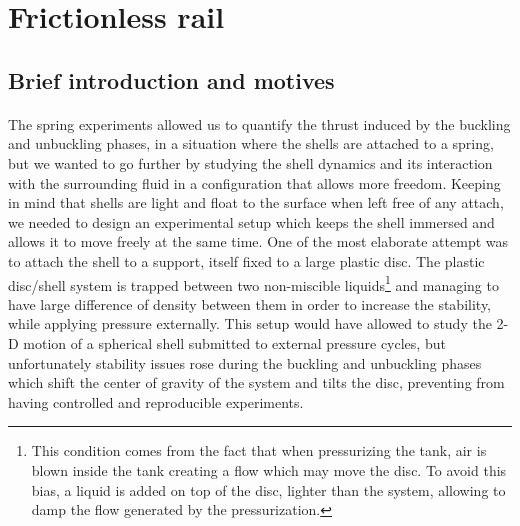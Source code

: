\section{Frictionless rail}
\subsection{Brief introduction and motives}
\paragraph{}
The spring experiments allowed us to quantify the thrust induced by the buckling and unbuckling phases, in a situation where the shells are attached to a spring, but we wanted to go further by studying the shell dynamics and its interaction with the surrounding fluid in a configuration that allows more freedom. Keeping in mind that shells are light and float to the surface when left free of any attach, we needed to design an experimental setup which keeps the shell immersed and allows it to move freely at the same time.  One of the most elaborate attempt was to attach the shell to a support, itself fixed to a large plastic disc. The plastic disc/shell system is trapped between two non-miscible liquids\footnote{This condition comes from the fact that when pressurizing the tank, air is blown inside the tank creating a flow which may move the disc. To avoid this bias, a liquid is added on top of the disc, lighter than the system, allowing to damp the flow generated by the pressurization.} and managing to have large difference of density between them in order to increase the stability, while applying pressure externally. This setup would have allowed to study the 2-D motion of a spherical shell submitted to external pressure cycles, but unfortunately stability issues rose during the buckling and unbuckling phases which shift the center of gravity of the system and tilts the disc, preventing from having controlled and reproducible experiments.
